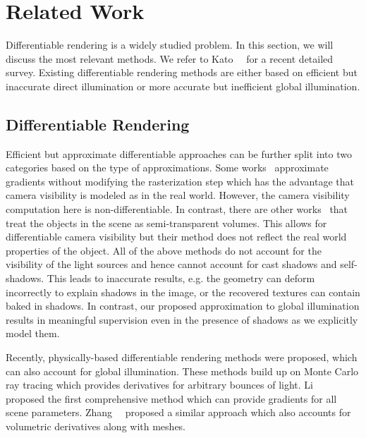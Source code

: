 %
\section{Related Work}
%
\label{sec:relatedwork}
%
%
Differentiable rendering is a widely studied problem.
%
In this section, we will discuss the most relevant methods. 
%
We refer to Kato~\etal~\cite{kato2018renderer} for a recent detailed survey.
%
Existing differentiable rendering methods are either based on efficient but inaccurate direct illumination or more accurate but inefficient global illumination. 
%
%
\subsection{Differentiable Rendering}
%
Efficient but approximate differentiable approaches can be further split into two categories based on the type of approximations. 
%
Some works~\cite{Loper:ECCV:2014,kato2019vpl, kato2018renderer,laine2020modular} approximate gradients without modifying the rasterization step which has the advantage that camera visibility is modeled as in the real world.
%
However, the camera visibility computation here is non-differentiable.
%
In contrast, there are other works~\cite{Rhodin:2015, liu2019soft} that treat the objects in the scene as semi-transparent volumes.
%
This allows for differentiable camera visibility but their method does not reflect the real world properties of the object. 
%
All of the above methods do not account for the visibility of the light sources and hence cannot account for cast shadows and self-shadows. 
%
This leads to inaccurate results, e.g. the geometry can deform incorrectly to explain shadows in the image, or the recovered textures can contain baked in shadows.
%
In contrast, our proposed approximation to global illumination results in meaningful supervision even in the presence of shadows as we explicitly model them.
%
\par
%
Recently, physically-based differentiable rendering methods were proposed, which can also account for global illumination. 
%
These methods build up on Monte Carlo ray tracing which provides derivatives for arbitrary bounces of light. 
%
Li~\etal~\cite{li2018differentiable} proposed the first comprehensive method which can provide gradients for all scene parameters.
%
Zhang~\etal~\cite{10.1145/3355089.3356522} proposed a similar approach which also accounts for volumetric derivatives along with meshes.
